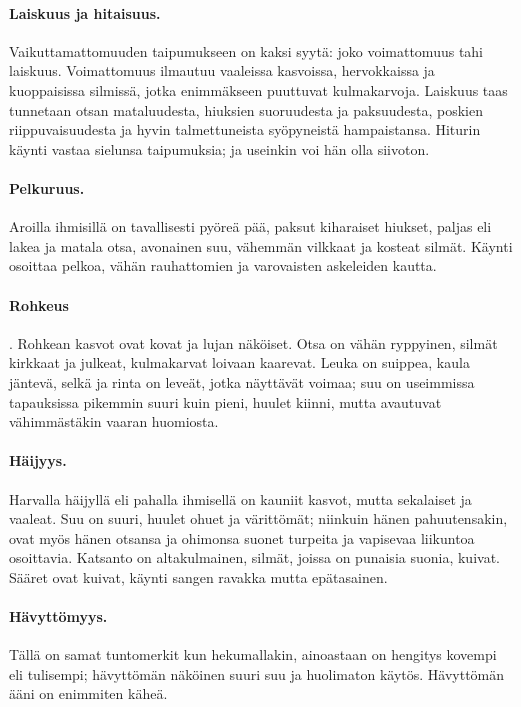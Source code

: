 \documentclass[11pt, twoside, finnish, a5paper]{book}
\begin{document}
\paragraph{Laiskuus ja hitaisuus.}
Vaikuttamattomuuden taipumukseen on kaksi syytä:
joko voimattomuus tahi laiskuus. Voimattomuus ilmautuu
vaaleissa kasvoissa, hervokkaissa ja kuoppaisissa
silmissä, jotka enimmäkseen puuttuvat kulmakarvoja.
Laiskuus taas tunnetaan otsan mataluudesta, hiuksien
suoruudesta ja paksuudesta, poskien riippuvaisuudesta
ja hyvin talmettuneista syöpyneistä hampaistansa. Hiturin
käynti vastaa sielunsa taipumuksia; ja useinkin voi
hän olla siivoton.

\paragraph{Pelkuruus.}
Aroilla ihmisillä on tavallisesti pyöreä pää, paksut
kiharaiset hiukset, paljas eli lakea ja matala otsa,
avonainen suu, vähemmän vilkkaat ja kosteat silmät. Käynti
osoittaa pelkoa, vähän rauhattomien ja varovaisten
askeleiden kautta.

\paragraph{Rohkeus}.
Rohkean kasvot ovat kovat ja lujan näköiset. Otsa
on vähän ryppyinen, silmät kirkkaat ja julkeat,
kulmakarvat loivaan kaarevat. Leuka on suippea, kaula jäntevä,
selkä ja rinta on leveät, jotka näyttävät voimaa;
suu on  useimmissa  tapauksissa pikemmin suuri  kuin
pieni,  huulet  kiinni,  mutta  avautuvat vähimmästäkin
vaaran huomiosta.

\paragraph{Häijyys.}
Harvalla häijyllä eli pahalla ihmisellä on kauniit kasvot,
mutta sekalaiset ja vaaleat. Suu on suuri, huulet ohuet
ja värittömät; niinkuin hänen pahuutensakin, ovat myös
hänen otsansa ja ohimonsa suonet turpeita ja vapisevaa
liikuntoa osoittavia. Katsanto on altakulmainen, silmät,
joissa on punaisia suonia, kuivat. Sääret ovat kuivat,
käynti sangen ravakka mutta epätasainen.

\paragraph{Hävyttömyys.}
Tällä on samat tuntomerkit kun hekumallakin, ainoastaan on
hengitys kovempi eli tulisempi; hävyttömän
näköinen suuri suu ja huolimaton käytös.
Hävyttömän ääni on enimmiten käheä.
\end{document}
